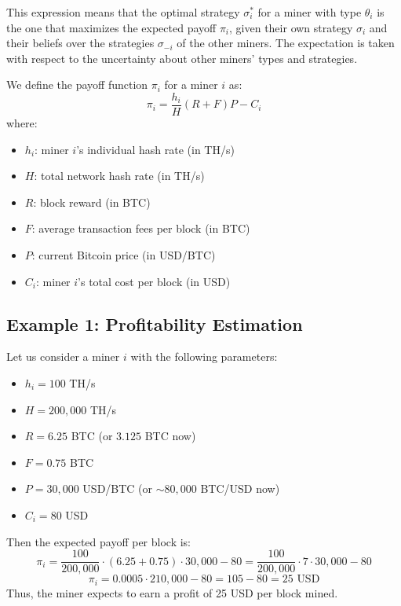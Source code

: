 \documentclass[12pt]{article}
\begin{document}
This expression means that the optimal strategy $\sigma_i^*$ for a miner with type $\theta_i$ is the one that maximizes the expected payoff $\pi_i$, given their own strategy $\sigma_i$ and their beliefs over the strategies $\sigma_{-i}$ of the other miners. The expectation is taken with respect to the uncertainty about other miners' types and strategies.

We define the payoff function $\pi_i$ for a miner $i$ as:
\begin{equation}
	\pi_i = \frac{h_i}{H} (R + F)P - C_i
\end{equation}
where:
\begin{itemize}
	\item $h_i$: miner $i$'s individual hash rate (in TH/s)
	\item $H$: total network hash rate (in TH/s)
	\item $R$: block reward (in BTC)
	\item $F$: average transaction fees per block (in BTC)
	\item $P$: current Bitcoin price (in USD/BTC)
	\item $C_i$: miner $i$'s total cost per block (in USD)
\end{itemize}

\subsection*{Example 1: Profitability Estimation}
Let us consider a miner $i$ with the following parameters:
\begin{itemize}
	\item $h_i = 100$ TH/s
	\item $H = 200{,}000$ TH/s
	\item $R = 6.25$ BTC (or $3.125$ BTC now)
	\item $F = 0.75$ BTC
	\item $P = 30{,}000$ USD/BTC (or $\sim 80{,}000$ BTC/USD now)
	\item $C_i = 80$ USD
\end{itemize}
Then the expected payoff per block is:
\begin{equation}
	\pi_i = \frac{100}{200{,}000} \cdot (6.25 + 0.75) \cdot 30{,}000 - 80 = \frac{100}{200{,}000} \cdot 7 \cdot 30{,}000 - 80
\end{equation}
\begin{equation}
	\pi_i = 0.0005 \cdot 210{,}000 - 80 = 105 - 80 = 25 \text{ USD}
\end{equation}
Thus, the miner expects to earn a profit of 25 USD per block mined.
\end{document}
